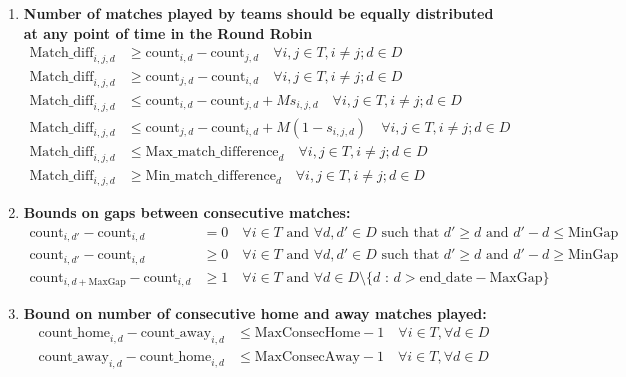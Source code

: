 \documentclass[a4paper, 12pt]{article}
\begin{document}
\begin{enumerate}
    \item \textbf{Number of matches played by teams should be equally distributed at any point of time in the Round Robin}
    \begin{align*}
    \text{Match\_diff}_{i,j,d} &\geq \text{count}_{i,d} - \text{count}_{j,d} \quad \forall i,j \in T, i \neq j; d \in D\\
    \text{Match\_diff}_{i,j,d} &\geq \text{count}_{j,d} - \text{count}_{i,d}\quad \forall i,j \in T, i \neq j; d \in D\\
    \text{Match\_diff}_{i,j,d} &\leq \text{count}_{i,d} - \text{count}_{j,d} + M s_{i,j,d} \quad \forall i,j \in T, i \neq j; d \in D\\
    \text{Match\_diff}_{i,j,d} &\leq \text{count}_{j,d} - \text{count}_{i,d} + M (1 - s_{i,j,d}) \quad \forall i,j \in T, i \neq j; d \in D\\
    \text{Match\_diff}_{i,j,d} &\leq \text{Max\_match\_difference}_{d} \quad \forall i,j \in T, i \neq j; d \in D\\
    \text{Match\_diff}_{i,j,d} &\geq \text{Min\_match\_difference}_{d} \quad \forall i,j \in T, i \neq j; d \in D
    \end{align*}

    \item \textbf{Bounds on gaps between consecutive matches:}
    \begin{align*}
        \text{count}_{i,d'} - \text{count}_{i,d} &= 0 \quad \forall i \in T \text{ and } \forall d, d' \in D \text{ such that $d' \geq d$ and $d' - d \leq \text{MinGap}$} \\
        \text{count}_{i,d'} - \text{count}_{i,d} &\geq 0 \quad \forall i \in T \text{ and } \forall d, d' \in D \text{ such that $d' \geq d$ and $d' - d \geq \text{MinGap}$} \\
        \text{count}_{i,d+\text{MaxGap}} - \text{count}_{i,d} &\geq 1 \quad \forall i \in T \text{ and } \forall d \in D \setminus \{d \text{ : } d > \text{end\_date} - \text{MaxGap} \} 
    \end{align*}

    \item \textbf{Bound on number of consecutive home and away matches played:}
    \begin{align*}
        \text{count\_home}_{i,d} - \text{count\_away}_{i,d} &\leq \text{MaxConsecHome} - 1 \quad \forall i \in T , \forall d \in D \\
        \text{count\_away}_{i,d} - \text{count\_home}_{i,d} &\leq \text{MaxConsecAway} - 1 \quad \forall i \in T , \forall d \in D
    \end{align*}


\end{enumerate}
\end{document}
